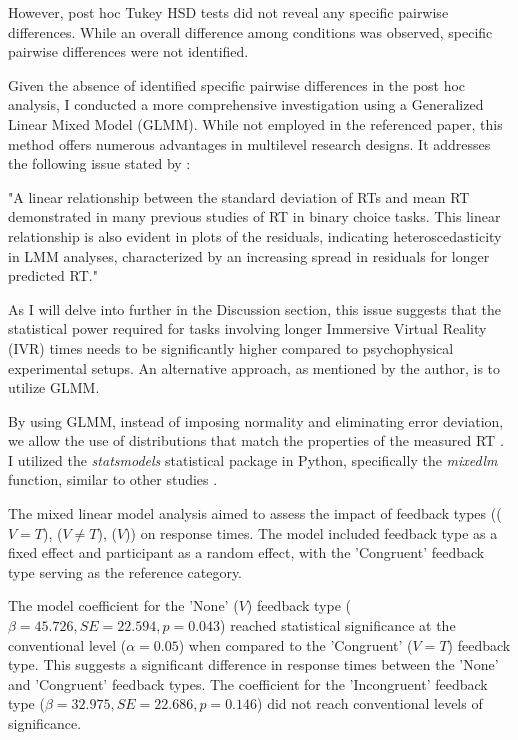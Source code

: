 \documentclass[12pt,oneside,openright]{report}
\begin{document}
However, post hoc Tukey HSD tests did not reveal any specific pairwise differences. While an overall difference among conditions was observed, specific pairwise differences were not identified.

Given the absence of identified specific pairwise differences in the post hoc analysis, I conducted a more comprehensive investigation using a Generalized Linear Mixed Model (GLMM). While not employed in the referenced paper, this method offers numerous advantages in multilevel research designs. It addresses the following issue stated by \textcite{Lo2015-fv}: 

"A linear relationship between the standard deviation of RTs and mean RT demonstrated in many previous studies of RT in binary choice tasks. This linear relationship is also evident in plots of the residuals, indicating heteroscedasticity in LMM analyses, characterized by an increasing spread in residuals for longer predicted RT."

As I will delve into further in the Discussion section, this issue suggests that the statistical power required for tasks involving longer Immersive Virtual Reality (IVR) times needs to be significantly higher compared to psychophysical experimental setups. An alternative approach, as mentioned by the author, is to utilize GLMM.

By using GLMM, instead of imposing normality and eliminating error deviation, we allow the use of distributions that match the properties of the measured RT \parencite{Lo2015-fv}. I utilized the \textit{statsmodels} statistical package in Python, specifically the \textit{mixedlm} function, similar to other studies \parencite{RSE_FBI}.

The mixed linear model analysis aimed to assess the impact of feedback types (($V=T$), ($V \neq T$), ($V$)) on response times. The model included feedback type as a fixed effect and participant as a random effect, with the 'Congruent' feedback type serving as the reference category.

The model coefficient for the 'None' ($V$) feedback type ($\beta = 45.726, SE = 22.594, p = 0.043$) reached statistical significance at the conventional level ($\alpha =0.05 $) when compared to the 'Congruent' ($V=T$) feedback type. This suggests a significant difference in response times between the 'None' and 'Congruent' feedback types. The coefficient for the 'Incongruent' feedback type ($\beta = 32.975, SE = 22.686, p = 0.146$) did not reach conventional levels of significance.
\end{document}
